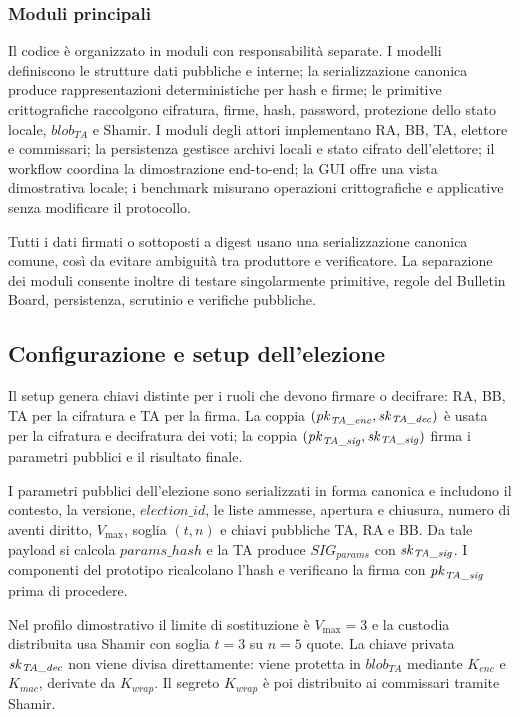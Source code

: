 \subsubsection{Moduli principali}

Il codice \`e organizzato in moduli con responsabilit\`a separate. I modelli definiscono le strutture dati pubbliche e interne; la serializzazione canonica produce rappresentazioni deterministiche per hash e firme; le primitive crittografiche raccolgono cifratura, firme, hash, password, protezione dello stato locale, $\mathit{blob}_{\mathit{TA}}$ e Shamir. I moduli degli attori implementano RA, BB, TA, elettore e commissari; la persistenza gestisce archivi locali e stato cifrato dell'elettore; il workflow coordina la dimostrazione end-to-end; la GUI offre una vista dimostrativa locale; i benchmark misurano operazioni crittografiche e applicative senza modificare il protocollo.

Tutti i dati firmati o sottoposti a digest usano una serializzazione canonica comune, cos\`i da evitare ambiguit\`a tra produttore e verificatore. La separazione dei moduli consente inoltre di testare singolarmente primitive, regole del Bulletin Board, persistenza, scrutinio e verifiche pubbliche.

\subsection{Configurazione e setup dell'elezione}
\label{wp4:configurazione-setup}

Il setup genera chiavi distinte per i ruoli che devono firmare o decifrare: RA, BB, TA per la cifratura e TA per la firma. La coppia $(\mathit{pk}_{\mathit{TA\_enc}}, \mathit{sk}_{\mathit{TA\_dec}})$ \`e usata per la cifratura e decifratura dei voti; la coppia $(\mathit{pk}_{\mathit{TA\_sig}}, \mathit{sk}_{\mathit{TA\_sig}})$ firma i parametri pubblici e il risultato finale.

I parametri pubblici dell'elezione sono serializzati in forma canonica e includono il contesto, la versione, $\mathit{election\_id}$, le liste ammesse, apertura e chiusura, numero di aventi diritto, $V_{\max}$, soglia $(t,n)$ e chiavi pubbliche TA, RA e BB. Da tale payload si calcola $\mathit{params\_hash}$ e la TA produce $\mathit{SIG}_{\mathit{params}}$ con $\mathit{sk}_{\mathit{TA\_sig}}$. I componenti del prototipo ricalcolano l'hash e verificano la firma con $\mathit{pk}_{\mathit{TA\_sig}}$ prima di procedere.

Nel profilo dimostrativo il limite di sostituzione \`e $V_{\max}=3$ e la custodia distribuita usa Shamir con soglia $t=3$ su $n=5$ quote. La chiave privata $\mathit{sk}_{\mathit{TA\_dec}}$ non viene divisa direttamente: viene protetta in $\mathit{blob}_{\mathit{TA}}$ mediante $K_{\mathit{enc}}$ e $K_{\mathit{mac}}$, derivate da $K_{\mathit{wrap}}$. Il segreto $K_{\mathit{wrap}}$ \`e poi distribuito ai commissari tramite Shamir.

